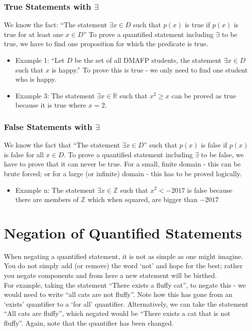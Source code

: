 \subsubsection{True Statements with $\exists$}
We know the fact: ``The statement $\exists x \in D$ such that $p(x)$ is true if $p(x)$ is true for at least one $x \in D$'' To prove a quantified statement including $\exists$ to be true, we have to find one proposition for which the predicate is true. 
\begin{itemize}
    \item Example 1: ``Let $D$ be the set of all DMAFP students, the statement $\exists x \in D$ such that $x$ is happy.'' To prove this is true - we only need to find one student who is happy.
    \item Example 3: The statement $\exists x \in \mathbb{R}$ such that $x^2 \geq x$ can be proved as true because it is true where $x=2$.
\end{itemize}
\subsubsection{False Statements with $\exists$}
We know the fact that ``The statement $\exists x \in D$'' such that $p(x)$ is false if $p(x)$ is false for all $x \in D$. To prove a quantified statement including $\exists$ to be false, we have to prove that it can never be true. For a small, finite domain - this can be brute forced; or for a large (or  infinite) domain - this has to be proved logically.
\begin{itemize}
    \item Example n: The statement $\exists x \in \mathbb{Z}$ such that $x^2 < -2017$ is false because there are members of $\mathbb{Z}$ which when squared, are bigger than $-2017$
\end{itemize}

\section{Negation of Quantified Statements}
When negating a quantified statement, it is not as simple as one might imagine. You do not simply add (or remove) the word `not' and hope for the best; rather you negate components and from here a new statement will be birthed.\\

For example, taking the statement ``There exists a fluffy cat'', to negate this - we would need to write ``all cats are not fluffy''. Note how this has gone from an `exists' quantifier to a `for all' quantifier. Alternatively, we can take the statement ``All cats are fluffy'', which negated would be ``There exists a cat that is not fluffy''. Again, note that the quantifier has been changed.\\

